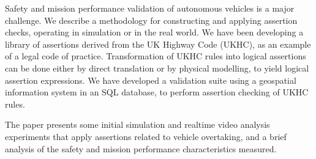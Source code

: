 Safety and mission performance validation of autonomous vehicles is a major challenge. We describe a methodology for constructing and applying assertion checks, operating in simulation or in the real world. We have been developing a library of assertions derived from the UK Highway Code (UKHC), as an example of a legal code of practice. Transformation of UKHC rules into logical assertions can be done either by direct translation or by physical modelling, to yield logical assertion expressions. We have developed a validation suite using a geospatial information system in an SQL database, to perform assertion checking of UKHC rules. 

The paper presents some initial simulation and realtime video analysis experiments that apply assertions related to vehicle overtaking, and a brief analysis of the safety and mission performance characteristics measured.